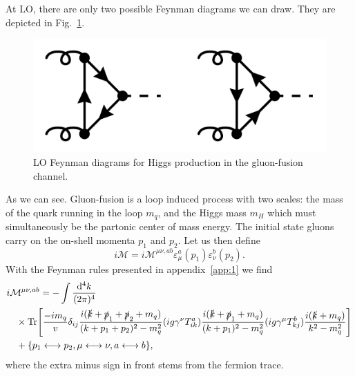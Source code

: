 At LO, there are only two possible Feynman diagrams we can draw. They are depicted in Fig.~\ref{fig:4:LO}.
\begin{figure}[h]
\centering
\includegraphics[scale=0.2]{Images/LO.pdf}
\caption{\acs{LO} Feynman diagrams for Higgs production in the gluon-fusion channel.}
\label{fig:4:LO}
\end{figure}
As we can see. Gluon-fusion is a loop induced process with two scales: the mass of the quark running in the loop $m_q$, and the Higgs mass $m_H$ which must simultaneously be the partonic center of mass energy. The initial state gluons carry on the on-shell momenta $p_1$ and $p_2$. Let us then define
\begin{equation}
i\mathcal{M} = i \mathcal{M}^{\mu\nu, ab} \varepsilon_\mu^a(p_1) \varepsilon_\nu^b(p_2).
\end{equation}
With the Feynman rules presented in appendix~\ref{app:1} we find
\begin{equation}
\begin{split}
&i \mathcal{M}^{\mu \nu, ab} = -\int \frac{\mathrm{d}^4 k}{(2\pi)^4}\, \\
&\quad \times \text{Tr}\!\left[ \frac{-i m_q}{v} \delta_{ij} \frac{i(\slashed{k} + \slashed{p}_1 + \slashed{p}_2 + m_q)}{(k + p_1 + p_2)^2 - m_q^2} (ig \gamma^\nu T^a_{ik}) \frac{i (\slashed{k} + \slashed{p}_1 + m_q)}{(k + p_1)^2 - m_q^2} (i g \gamma^\mu T^b_{kj}) \frac{i (\slashed{k} + m_q)}{k^2 - m_q^2} \right] \\
&\quad + \lbrace p_1 \longleftrightarrow p_2,  \mu \longleftrightarrow \nu, a \longleftrightarrow b \rbrace ,
\label{eq:4:form_factor_amplitude}
\end{split}
\end{equation}
where the extra minus sign in front stems from the fermion trace.

